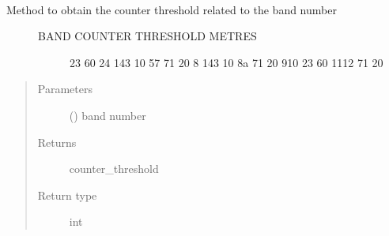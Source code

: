 \begin{fulllineitems}
\label{\detokenize{s2boa.ingestions:s2boa.ingestions.functions.get_centre_name_by_alias}}
\end{fulllineitems}


\begin{fulllineitems}
\label{\detokenize{s2boa.ingestions:s2boa.ingestions.functions.get_centres_conf}}
\end{fulllineitems}


\begin{fulllineitems}
\label{\detokenize{s2boa.ingestions:s2boa.ingestions.functions.get_counter_threshold}}~\begin{description}
\item[{Method to obtain the counter threshold related to the band number}] \leavevmode\begin{description}
\item[{BAND     COUNTER THRESHOLD    METRES}]               23            60
2\sphinxhyphen{}4           143            10
5\sphinxhyphen{}7            71            20
8             143            10
8a             71            20
9\sphinxhyphen{}10           23            60
11\sphinxhyphen{}12          71            20

\end{description}

\end{description}
\begin{quote}\begin{description}
\item[{Parameters}] \leavevmode
{} () \textendash{} band number

\item[{Returns}] \leavevmode
counter\_threshold

\item[{Return type}] \leavevmode
int

\end{description}\end{quote}

\end{fulllineitems}

